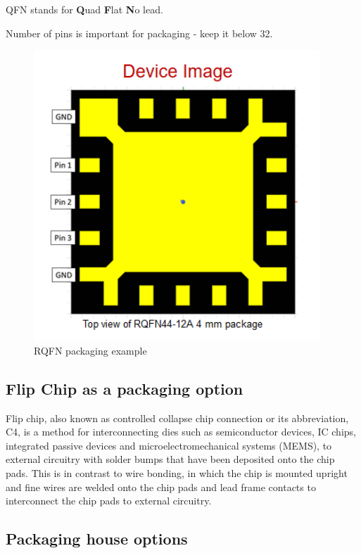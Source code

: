 \documentclass{article}
\begin{document}
QFN stands for \textbf{Q}uad \textbf{F}lat \textbf{N}o lead.

Number of pins is important for packaging - keep it below 32.



\begin{figure}[ht!]
	\centering %
	\includegraphics[width=0.5\linewidth]{Figures/RQFN-4-mm.png}
	\caption{RQFN packaging example }
	\label{fig:rqfn-example}
\end{figure}

\subsection{Flip Chip as a packaging option}

Flip chip, also known as controlled collapse chip connection or its abbreviation, C4, is a method for interconnecting dies such as semiconductor devices, IC chips, integrated passive devices and microelectromechanical systems (MEMS), to external circuitry with solder bumps that have been deposited onto the chip pads. This is in contrast to wire bonding, in which the chip is mounted upright and fine wires are welded onto the chip pads and lead frame contacts to interconnect the chip pads to external circuitry.


\subsection{Packaging house options}
\end{document}
